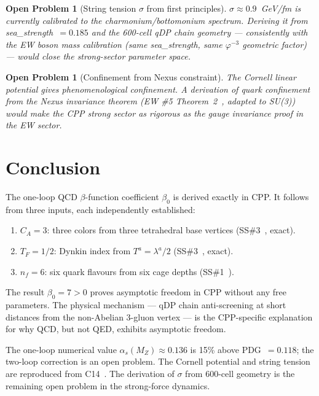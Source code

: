 \documentclass[11pt,a4paper]{article}
\newtheorem{openprob}[theorem]{Open Problem}
\newcommand{\phig}{\varphi}
\newcommand{\as}{\alpha_s}
\begin{document}
\begin{openprob}[String tension $\sigma$ from first principles]
\label{op:sigma}
$\sigma \approx 0.9$~GeV/fm is currently calibrated to the
charmonium/bottomonium spectrum.  Deriving it from
sea\_strength~$= 0.185$ and the 600-cell qDP chain geometry
--- consistently with the EW boson mass calibration (same
sea\_strength, same $\phig^{-3}$ geometric factor) --- would
close the strong-sector parameter space.
\end{openprob}

\begin{openprob}[Confinement from Nexus constraint]
\label{op:nexus_conf}
The Cornell linear potential gives phenomenological confinement.
A derivation of quark confinement from the \emph{Nexus invariance
theorem} (EW \#5 Theorem~2~\citep{cpp_ew5}, adapted to SU(3))
would make the CPP strong sector as rigorous as the gauge
invariance proof in the EW sector.
\end{openprob}

\section{Conclusion}

The one-loop QCD $\beta$-function coefficient $\beta_0$ is derived
exactly in CPP.  It follows from three inputs, each independently
established:
\begin{enumerate}
\item $C_A = 3$: three colors from three tetrahedral base vertices
  (SS\#3~\citep{cpp_ss3}, exact).
\item $T_F = 1/2$: Dynkin index from $T^a = \lambda^a/2$
  (SS\#3~\citep{cpp_ss3}, exact).
\item $n_f = 6$: six quark flavours from six cage depths
  (SS\#1~\citep{cpp_ss1}).
\end{enumerate}

The result $\beta_0 = 7 > 0$ proves asymptotic freedom in CPP
without any free parameters.  The physical mechanism --- qDP
chain anti-screening at short distances from the non-Abelian
3-gluon vertex --- is the CPP-specific explanation for why
QCD, but not QED, exhibits asymptotic freedom.

The one-loop numerical value $\as(M_Z) \approx 0.136$ is 15\%
above PDG~$= 0.118$; the two-loop correction is an open problem.
The Cornell potential and string tension are reproduced from
C14~\citep{c14}.  The derivation of $\sigma$ from 600-cell
geometry is the remaining open problem in the strong-force
dynamics.
\end{document}
